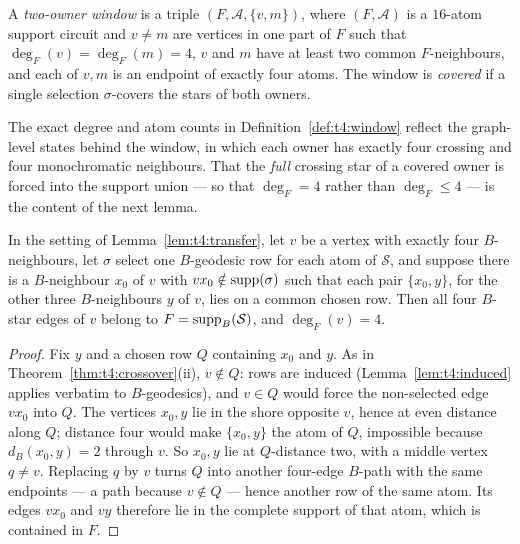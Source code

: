 \begin{definition}\label{def:t4:window}
A \emph{two-owner window} is a triple \((F,\mathcal A,\{v,m\})\), where
\((F,\mathcal A)\) is a \(16\)-atom support circuit and \(v\ne m\) are
vertices in one part of \(F\) such that
\(\deg_F(v)=\deg_F(m)=4\), \(v\) and \(m\) have at least two common
\(F\)-neighbours, and each of \(v,m\) is an endpoint of exactly four
atoms. The window is \emph{covered} if a single selection
\(\sigma\)-covers the stars of both owners.
\end{definition}

The exact degree and atom counts in Definition~\ref{def:t4:window}
reflect the graph-level states behind the window, in which each owner
has exactly four crossing and four monochromatic neighbours. That the
\emph{full} crossing star of a covered owner is forced into the support
union --- so that \(\deg_F=4\) rather than \(\deg_F\le4\) --- is the
content of the next lemma.

\begin{lemma}\label{lem:t4:absorption}
In the setting of Lemma~\textup{\ref{lem:t4:transfer}}, let \(v\) be a
vertex with exactly four \(B\)-neighbours, let \(\sigma\) select one
\(B\)-geodesic row for each atom of \(\mathcal S\), and suppose there
is a \(B\)-neighbour \(x_0\) of \(v\) with
\(vx_0\notin\operatorname{supp}(\sigma)\) such that each pair \(\{x_0,y\}\), for the
other three \(B\)-neighbours \(y\) of \(v\), lies on a common chosen
row. Then all four \(B\)-star edges of \(v\) belong to
\(F=\operatorname{supp}_B(\mathcal S)\), and \(\deg_F(v)=4\).
\end{lemma}

\begin{proof}
Fix \(y\) and a chosen row \(Q\) containing \(x_0\) and \(y\). As in
Theorem~\ref{thm:t4:crossover}(ii), \(v\notin Q\): rows are induced
(Lemma~\ref{lem:t4:induced} applies verbatim to \(B\)-geodesics), and
\(v\in Q\) would force the non-selected edge \(vx_0\) into \(Q\). The
vertices \(x_0,y\) lie in the shore opposite \(v\), hence at even
distance along \(Q\); distance four would make \(\{x_0,y\}\) the atom
of \(Q\), impossible because \(d_B(x_0,y)=2\) through \(v\). So
\(x_0,y\) lie at \(Q\)-distance two, with a middle vertex
\(q\ne v\). Replacing \(q\) by \(v\) turns \(Q\) into another
four-edge \(B\)-path with the same endpoints --- a path because
\(v\notin Q\) --- hence another row of the same atom. Its edges
\(vx_0\) and \(vy\) therefore lie in the complete support of that atom,
which is contained in \(F\).
\end{proof}

